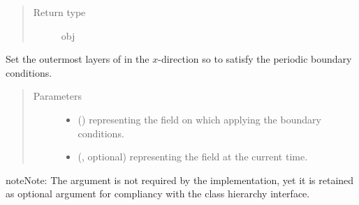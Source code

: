 \documentclass[letterpaper,10pt,english]{sphinxmanual}
\begin{document}
\begin{fulllineitems}
\begin{fulllineitems}
\begin{quote}
\begin{description}
\item[{Return type}] \leavevmode
obj

\end{description}\end{quote}

\end{fulllineitems}


\begin{fulllineitems}
\label{\detokenize{api:tasmania.dycore.horizontal_boundary_periodic.PeriodicXZ.set_outermost_layers_x}}
Set the outermost layers of  in the \(x\)-direction so to satisfy the periodic
boundary conditions.
\begin{quote}\begin{description}
\item[{Parameters}] \leavevmode\begin{itemize}
\item {} 
 () \textendash{}  representing the field on which applying the boundary conditions.

\item {} 
 (, optional) \textendash{}  representing the field at the current time.

\end{itemize}

\end{description}\end{quote}

\begin{sphinxadmonition}{note}{Note:}
The argument  is not required by the implementation, yet it is retained as optional
argument for compliancy with the class hierarchy interface.
\end{sphinxadmonition}

\end{fulllineitems}


\end{fulllineitems}
\end{document}
